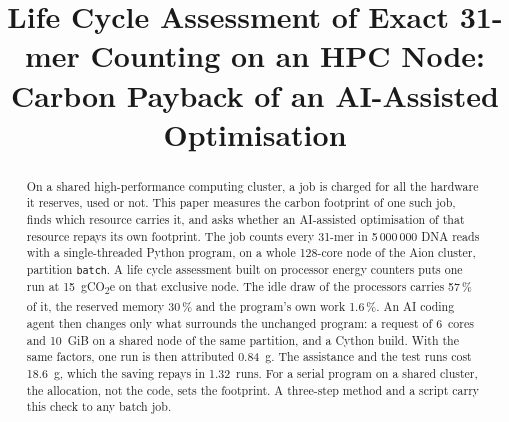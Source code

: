 \documentclass[conference,a4paper]{IEEEtran}
\newif\ifguidance
\newcommand{\guidance}[1]{\ifguidance{\itshape\small #1\par\medskip}\fi}
\begin{document}
\title{Life Cycle Assessment of Exact 31-mer Counting on an HPC Node: Carbon Payback of an AI-Assisted Optimisation}

\author{
}

\maketitle


\begin{abstract}
On a shared high-performance computing cluster, a job is charged for all the
hardware it reserves, used or not. This paper measures the carbon footprint of
one such job, finds which resource carries it, and asks whether an AI-assisted
optimisation of that resource repays its own footprint. The job counts every
31-mer in 5\,000\,000 DNA reads with a single-threaded Python program, on a
whole 128-core node of the Aion cluster, partition \texttt{batch}. A life cycle
assessment built on processor energy counters puts one run at
15~gCO\textsubscript{2}e on that exclusive node. The idle draw of the processors
carries 57\,\% of it, the reserved memory 30\,\% and the program's own work
1.6\,\%. An AI coding agent then changes only what surrounds the unchanged
program: a request of 6~cores and 10~GiB on a shared node of the same
partition, and a Cython build. With the same factors, one run is then
attributed 0.84~g. The assistance and the test runs cost 18.6~g, which the
saving repays in 1.32~runs. For a serial program on a shared cluster, the
allocation, not the code, sets the footprint. A three-step method and a script
carry this check to any batch job.
\end{abstract}

\guidance{\textbf{This is the HPC job track.} The archive also holds
\texttt{src/short-paper-mics.tex}, which is the same paper written for a web
page. Write one of the two. Delete the other, and the build follows.}
\end{document}
